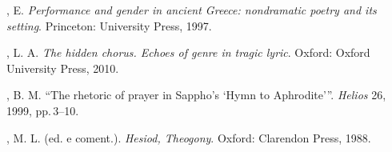 \begin{bibliohedra}
, E. \textit{Performance and gender in ancient Greece: nondramatic poetry and its setting}. Princeton: University Press, 1997.

, L. A. \textit{The hidden chorus. Echoes of genre in tragic lyric}. Oxford: Oxford University Press, 2010.

, B. M. “The rhetoric of prayer in Sappho's `Hymn to Aphrodite'”. \textit{Helios} 26, 1999, pp.\,3--10.

, M. L. (ed. e coment.). \textit{Hesiod, Theogony}. Oxford: Clarendon Press, 1988.


\end{bibliohedra}


